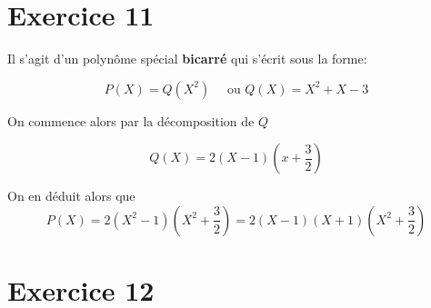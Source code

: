 \documentclass{report}
\begin{document}
\section{Exercice 11} %
\begin{myproof}
  Il s'agit d'un  polynôme spécial \textbf{bicarré} qui s'écrit sous la forme:

  $$
  P(X) = Q(X^2) \quad \text{ ou } Q(X) = X^2 + X - 3
  $$

  On commence alors par la décomposition de $Q$

  $$
  Q(X) = 2(X-1)(x + \frac{3}{2})
  $$

  On en déduit alors que 
  $$
  P(X) = 2(X^2- 1)(X^2 + \frac{3}{2}) = 2(X-1)(X+1)(X^2 + \frac{3}{2})
  $$
\end{myproof}

\section{Exercice 12} %
\end{document}
